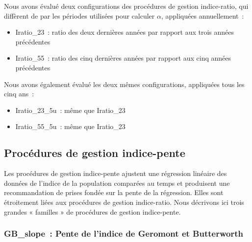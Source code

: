 \documentclass[french,11pt]{book}
\begin{document}
Nous avons évalué deux configurations des procédures de gestion indice-ratio, qui diffèrent de par les périodes utilisées pour calculer \(\alpha\), appliquées annuellement~:
\begin{itemize}
\item
  Iratio\_23~: ratio des deux dernières années par rapport aux trois années précédentes
\item
  Iratio\_55~: ratio des cinq dernières années par rapport aux cinq années précédentes
\end{itemize}
Nous avons également évalué les deux mêmes configurations, appliquées tous les cinq ans~:
\begin{itemize}
\item
  Iratio\_23\_5u~: même que Iratio\_23
\item
  Iratio\_55\_5u~: même que Iratio\_23
\end{itemize}
\hypertarget{sec:mp-islope}{%
\subsection{Procédures de gestion indice-pente}\label{sec:mp-islope}}

Les procédures de gestion indice-pente ajustent une régression linéaire des données de l'indice de la population comparées au temps et produisent une recommandation de prises fondée sur la pente de la régression. Elles sont étroitement liées aux procédures de gestion indice-ratio. Nous décrivons ici trois grandes « familles » de procédures de gestion indice-pente.

\hypertarget{sec:mp-gb-slope}{%
\subsubsection{GB\_slope~: Pente de l'indice de Geromont et Butterworth}\label{sec:mp-gb-slope}}
\end{document}
